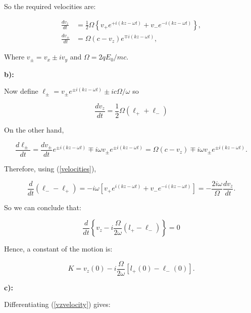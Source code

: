 So the required velocities are:

\begin{equation}\label{velocities}
	\begin{split}
		\frac{d v_{z}}{d t}&=\frac{1}{2} \Omega\left\{v_{+} e^{+i(k z-\omega t)}+v_{-} e^{-i(k z-\omega t)}\right\}, \\
		\frac{d v_{\pm}}{d t}&=\Omega\left(c-v_{z}\right) e^{\mp i(k z-\omega t)},
	\end{split}
\end{equation}

Where $v_{\pm}=v_{x} \pm i v_{y}$ and $\Omega=2 q E_{0} / m c$.

\textbf{b):}

Now define $\ell_{\pm}=v_{\pm} e^{\pm i(k z-\omega t)} \pm i c \Omega / \omega$ so

\begin{equation}\label{vzvelocity}
	\frac{d v_{z}}{d t}=\frac{1}{2} \Omega\left(\ell_{+}+\ell_{-}\right)
\end{equation}

On the other hand,

\begin{equation}
	\frac{d \ell_{\pm}}{d t}=\frac{d v_{\pm}}{d t} e^{\pm i(k z-\omega t)} \mp i \omega v_{\pm} e^{\pm i(k z-\omega t)}=\Omega\left(c-v_{z}\right) \mp i \omega v_{\pm} e^{\pm i(k z-\omega t)}.
\end{equation}
	
Therefore, using (\ref{velocities}),

\begin{equation}
	\frac{d}{d t}\left(\ell_{-}-\ell_{+}\right)=-i \omega\left[v_{+} e^{i(k z-\omega t)}+v_{-} e^{-i(k z-\omega t)}\right]=-\frac{2 i \omega}{\Omega} \frac{d v_{z}}{d t}.
\end{equation}

So we can conclude that:

\begin{equation}
	\frac{d}{d t}\left\{v_{z}-i \frac{\Omega}{2 \omega}\left(l_{+}-\ell_{-}\right)\right\}=0
\end{equation}

Hence, a constant of the motion is:

\begin{equation}
	K=v_{z}(0)-i \frac{\Omega}{2 \omega}\left[l_{+}(0)-\ell_{-}(0)\right] .
\end{equation}

\textbf{c):}

Differentiating (\ref{vzvelocity}) gives:

